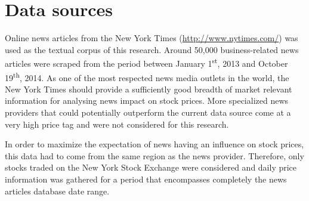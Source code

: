 \documentclass{article}
\begin{document}
\section{Data sources}
Online news articles from the New York Times (\url{http://www.nytimes.com/}) was used as the textual corpus of this research. Around 50,000 business-related news articles were scraped from the period between January 1\textsuperscript{st}, 2013 and October 19\textsuperscript{th}, 2014. As one of the most respected news media outlets in the world, the New York Times should provide a sufficiently good breadth of market relevant information for analysing news impact on stock prices. More specialized news providers that could potentially outperform the current data source come at a very high price tag and were not considered for this research.
\par
In order to maximize the expectation of news having an influence on stock prices, this data had to come from the same region as the news provider. Therefore, only stocks traded on the New York Stock Exchange were considered and daily price information was gathered for a period that encompasses completely the news articles database date range.
\end{document}
